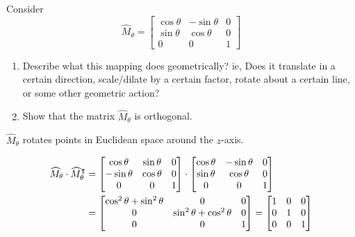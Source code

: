 \documentclass[newpage,hints,handout]{ximera}
\begin{document}
\begin{problem}
  Consider
  \[
  \hat{M}_\theta=\begin{bmatrix}
  \cos\theta & -\sin\theta & 0\\
  \sin\theta & \cos\theta & 0\\
  0 & 0 & 1
  \end{bmatrix}
  \]
  
\begin{enumerate}
 \item Describe what this mapping does geometrically? ie, Does it translate in a certain direction, scale/dilate by a certain factor, rotate about a certain line, or some other geometric action?
 \item Show that the matrix $\hat{M}_\theta$ is orthogonal.
\end{enumerate}


\begin{freeResponse}
$\hat{M}_\theta$ rotates points in Euclidean space around the $z$-axis. 
\end{freeResponse}



\begin{freeResponse}
\begin{align*}
\widehat{M}_\theta \cdot \widehat{M}_\theta^\intercal 
	&= \begin{bmatrix}
	\cos\theta & \sin\theta & 0 \\
	-\sin\theta & \cos\theta & 0 \\
	0 & 0 & 1
	\end{bmatrix} \cdot
	\begin{bmatrix}
	\cos\theta & -\sin\theta & 0 \\
	\sin\theta & \cos\theta & 0 \\
	0 & 0 & 1
	\end{bmatrix} \\
	&= \begin{bmatrix}
	\cos^{2}\theta + \sin^{2} \theta & 0 & 0 \\
	0 &  \sin^{2} \theta + \cos^{2}\theta  & 0 \\
	0 & 0 & 1
	\end{bmatrix}
	=  \begin{bmatrix}
	1 & 0 & 0 \\
	0 & 1  & 0 \\
	0 & 0 & 1
	\end{bmatrix}
\end{align*}
\end{freeResponse}
\end{problem}
\end{document}

